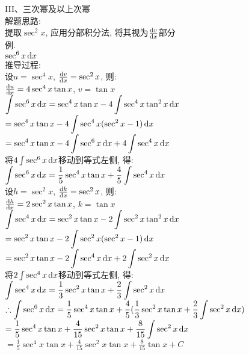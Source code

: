 III、三次幂及以上次幂\\
解题思路:\\
提取$\sec^2x$, 应用分部积分法, 将其视为$\frac{\mathop{}\!\mathrm{d} v}{\mathop{}\!\mathrm{d} x}$部分\\
例.\\
\phantom{例}$\displaystyle\sec^6x\mathop{}\!\mathrm{d} x$\\
推导过程:\\
设$u=\sec^4x$, $\frac{\mathop{}\!\mathrm{d} v}{\mathop{}\!\mathrm{d} x}=\sec^2x$, 则:\\
\phantom{设}$\frac{\mathop{}\!\mathrm{d} u}{\mathop{}\!\mathrm{d} x}=4\sec^4x\tan x$, $v=\tan x$\\
$\displaystyle\int\sec^6x\mathop{}\!\mathrm{d} x=\sec^4x\tan x-4\int\sec^4x\tan^2x\mathop{}\!\mathrm{d} x$\\
\phantom{$\displaystyle\int\sec^6x\dif x$}$\displaystyle=\sec^4x\tan x-4\int\sec^4x(\sec^2x-1)\mathop{}\!\mathrm{d} x$\\
\phantom{$\displaystyle\int\sec^6x\dif x$}$\displaystyle=\sec^4x\tan x-4\int\sec^6x\mathop{}\!\mathrm{d} x+4\int\sec^4x\mathop{}\!\mathrm{d} x$\\
将$4\int\sec^6x\mathop{}\!\mathrm{d} x$移动到等式左侧, 得:\\
$\displaystyle\int\sec^6x\mathop{}\!\mathrm{d} x=\frac{1}{5}\sec^4x\tan x+\frac{4}{5}\int\sec^4x\mathop{}\!\mathrm{d} x$\\
设$h=\sec^2x$, $\frac{\mathop{}\!\mathrm{d} k}{\mathop{}\!\mathrm{d} x}=\sec^2x$, 则:\\
\phantom{设}$\frac{\mathop{}\!\mathrm{d} h}{\mathop{}\!\mathrm{d} x}=2\sec^2x\tan x$, $k=\tan x$\\
$\displaystyle\int\sec^4x\mathop{}\!\mathrm{d} x=\sec^2x\tan x-2\int\sec^2x\tan^2x\mathop{}\!\mathrm{d} x$\\
\phantom{$\displaystyle\int\sec^4x\dif x$}$\displaystyle=\sec^2x\tan x-2\int\sec^2x(\sec^2x-1)\mathop{}\!\mathrm{d} x$\\
\phantom{$\displaystyle\int\sec^4x\dif x$}$\displaystyle=\sec^2x\tan x-2\int\sec^4x\mathop{}\!\mathrm{d} x+2\int\sec^2x\mathop{}\!\mathrm{d} x$\\
将$2\int\sec^4x\mathop{}\!\mathrm{d} x$移动到等式左侧, 得:\\
$\displaystyle\int\sec^4x\mathop{}\!\mathrm{d} x=\frac{1}{3}\sec^2x\tan x+\frac{2}{3}\int\sec^2x\mathop{}\!\mathrm{d} x$\\
$\displaystyle\therefore\int\sec^6x\mathop{}\!\mathrm{d} x=\frac{1}{5}\sec^4x\tan x+\frac{4}{5}(\frac{1}{3}\sec^2x\tan x+\frac{2}{3}\int\sec^2x\mathop{}\!\mathrm{d} x)$\\
\phantom{$\displaystyle\therefore\int\sec^6x\dif x$}$\displaystyle=\frac{1}{5}\sec^4x\tan x+\frac{4}{15}\sec^2x\tan x+\frac{8}{15}\int\sec^2x\mathop{}\!\mathrm{d} x$\\
\phantom{$\displaystyle\therefore\int\sec^6x\dif x$}$\displaystyle=\frac{1}{5}\sec^4x\tan x+\frac{4}{15}\sec^2x\tan x+\frac{8}{15}\tan x+C$\\[2ex]

